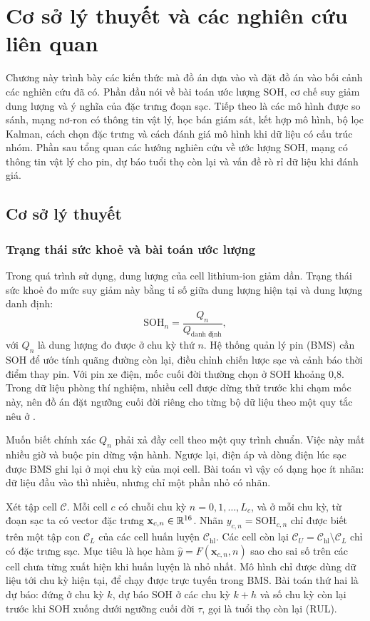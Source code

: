 \chapter{Cơ sở lý thuyết và các nghiên cứu liên quan}
\label{chap:background}\label{ch:lythuyet}

Chương này trình bày các kiến thức mà đồ án dựa vào và đặt đồ án vào bối cảnh các nghiên cứu đã có. Phần đầu nói về bài
toán ước lượng SOH, cơ chế suy giảm dung lượng và ý nghĩa của đặc trưng đoạn sạc. Tiếp theo là các mô hình được so sánh,
mạng nơ-ron có thông tin vật lý, học bán giám sát, kết hợp mô hình, bộ lọc Kalman, cách chọn đặc trưng và cách đánh giá mô
hình khi dữ liệu có cấu trúc nhóm. Phần sau tổng quan các hướng nghiên cứu về ước lượng SOH, mạng có thông tin vật lý cho
pin, dự báo tuổi thọ còn lại và vấn đề rò rỉ dữ liệu khi đánh giá.

\section{Cơ sở lý thuyết}\label{sec:coso}

\subsection{Trạng thái sức khoẻ và bài toán ước lượng}\label{sec:bai_toan}

Trong quá trình sử dụng, dung lượng của cell lithium-ion giảm dần. Trạng thái sức khoẻ đo mức suy giảm này bằng tỉ số
giữa dung lượng hiện tại và dung lượng danh định:
\begin{equation}
\mathrm{SOH}_n = \frac{Q_n}{Q_\text{danh định}},
\end{equation}
với $Q_n$ là dung lượng đo được ở chu kỳ thứ $n$. Hệ thống quản lý pin (BMS) cần SOH để ước tính quãng đường còn lại,
điều chỉnh chiến lược sạc và cảnh báo thời điểm thay pin. Với pin xe điện, mốc cuối đời thường chọn ở SOH khoảng 0,8.
Trong dữ liệu phòng thí nghiệm, nhiều cell được dừng thử trước khi chạm mốc này, nên đồ án đặt ngưỡng cuối đời riêng cho
từng bộ dữ liệu theo một quy tắc nêu ở .

Muốn biết chính xác $Q_n$ phải xả đầy cell theo một quy trình chuẩn. Việc này mất nhiều giờ và buộc pin dừng vận hành.
Ngược lại, điện áp và dòng điện lúc sạc được BMS ghi lại ở mọi chu kỳ của mọi cell. Bài toán vì vậy có dạng học ít nhãn:
dữ liệu đầu vào thì nhiều, nhưng chỉ một phần nhỏ có nhãn.

Xét tập cell $\mathcal{C}$. Mỗi cell $c$ có chuỗi chu kỳ $n = 0, 1, \dots, L_c$, và ở mỗi chu kỳ, từ đoạn sạc ta có
vector đặc trưng $\mathbf{x}_{c,n} \in \mathbb{R}^{16}$. Nhãn $y_{c,n} = \mathrm{SOH}_{c,n}$ chỉ được biết trên một tập con
$\mathcal{C}_L$ của các cell huấn luyện $\mathcal{C}_\text{hl}$. Các cell còn lại $\mathcal{C}_U = \mathcal{C}_\text{hl}
\setminus \mathcal{C}_L$ chỉ có đặc trưng sạc. Mục tiêu là học hàm $\hat y = F(\mathbf{x}_{c,n}, n)$ sao cho sai số trên
các cell chưa từng xuất hiện khi huấn luyện là nhỏ nhất. Mô hình chỉ được dùng dữ liệu tới chu kỳ hiện tại, để chạy được
trực tuyến trong BMS. Bài toán thứ hai là dự báo: đứng ở chu kỳ $k$, dự báo SOH ở các chu kỳ $k + h$ và số chu kỳ còn lại
trước khi SOH xuống dưới ngưỡng cuối đời $\tau$, gọi là tuổi thọ còn lại (RUL).

